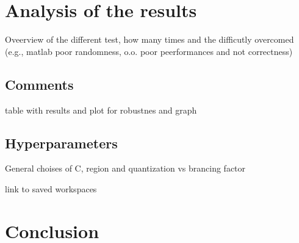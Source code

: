 \documentclass[11pt]{article}
\begin{document}
\pagebreak

\section{Analysis of the results}
Oveerview of the different test, how many times and the difficutly overcomed (e.g., matlab poor randomness, o.o. poor peerformances and not correctness)

\subsection{Comments}
table with results and plot for robustnes and graph

\subsection{Hyperparameters}
General choises of C, region and quantization vs brancing factor

link to saved workspaces

\section{Conclusion}



\end{document}
